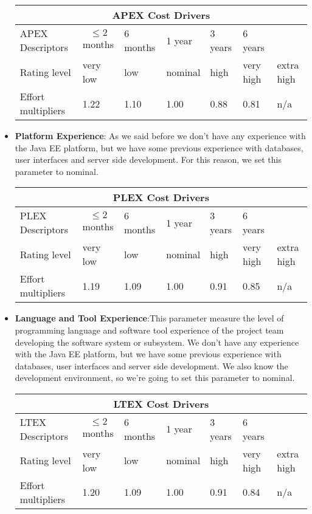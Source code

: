 \begin{itemize}
\begin{longtable}{| m{}| m{} | m{} | m{} | m{} | m{} | m{}| }
\hline
\multicolumn{7}{c}{APEX Cost Drivers}\\
\hline
\hline
APEX Descriptors & \begin{equation*}
{\le 2}
\end{equation*} months  & 6 months & 1 year & 3 years & 6 years & \\
\hline
Rating level & very low & low & nominal & high & very high & extra high \\
\hline
Effort multipliers & 1.22 & 1.10 & 1.00 & 0.88 & 0.81 & n/a \\
\hline
\end{longtable}

\item \textbf{Platform Experience}:
As we said before we don’t have any experience with the Java EE platform, but
we have some previous experience with databases, user interfaces
and server side development. For this reason, we set
this parameter to nominal.

\begin{longtable}{| m{}| m{} | m{} | m{} | m{} | m{} | m{}| }
\hline
\multicolumn{7}{c}{PLEX Cost Drivers}\\
\hline
\hline
PLEX Descriptors & \begin{equation*}
{\le 2}
\end{equation*} months  & 6 months & 1 year & 3 years & 6 years & \\
\hline
Rating level & very low & low & nominal & high & very high & extra high \\
\hline
Effort multipliers & 1.19 & 1.09 & 1.00 & 0.91 & 0.85 & n/a \\
\hline
\end{longtable}

\item\textbf{Language and Tool Experience}:This parameter measure the level of programming language and software tool experience of the project team developing the software system or subsystem. We don’t have any experience with the Java EE platform, but we have some previous experience with databases, user interfaces and server side development. We also know the development environment, so we’re going to set this parameter to nominal.

\begin{longtable}{| m{}| m{} | m{} | m{} | m{} | m{} | m{}| }
\hline
\multicolumn{7}{c}{LTEX Cost Drivers}\\
\hline
\hline
LTEX Descriptors & \begin{equation*}
{\le 2}
\end{equation*} months  & 6 months & 1 year & 3 years & 6 years & \\
\hline
Rating level & very low & low & nominal & high & very high & extra high \\
\hline
Effort multipliers & 1.20 & 1.09 & 1.00 & 0.91 & 0.84 & n/a \\
\hline
\end{longtable}


\end{itemize}
